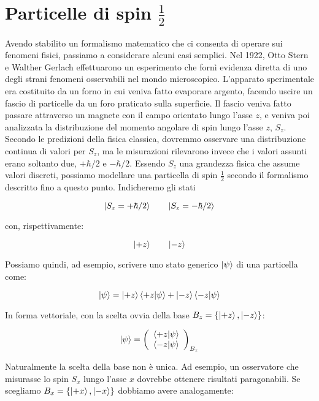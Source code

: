 \section{Particelle di spin $\frac{1}{2}$}

Avendo stabilito un formalismo matematico che ci consenta di operare sui fenomeni fisici, passiamo a considerare alcuni casi semplici.
Nel 1922, Otto Stern e Walther Gerlach effettuarono un esperimento che fornì evidenza diretta di uno degli strani fenomeni osservabili nel mondo microscopico.
L'apparato sperimentale era costituito da un forno in cui veniva fatto evaporare argento, facendo uscire un fascio di particelle da un foro praticato sulla superficie.
Il fascio veniva fatto passare attraverso un magnete con il campo orientato lungo l'asse $z$, e veniva poi analizzata la distribuzione del momento angolare di spin lungo l'asse $z$, $S_z$.
Secondo le predizioni della fisica classica, dovremmo osservare una distribuzione continua di valori per $S_z$, ma le misurazioni
rilevarono invece che i valori assunti erano soltanto due, $+ \hbar / 2$ e $- \hbar / 2$.
Essendo $S_z$ una grandezza fisica che assume valori discreti, possiamo modellare una particella di spin $\frac{1}{2}$ secondo il formalismo descritto fino a questo punto. Indicheremo gli stati

	\[
		\ket{S_z = + \hbar / 2} \quad \quad \ket{S_z = - \hbar / 2}
	\]

con, rispettivamente:

	\[
		\ket{+z} \quad \quad \ket{-z}
	\]

Possiamo quindi, ad esempio, scrivere uno stato generico $\ket{\psi}$ di una particella come:

	\begin{equation}
		\ket{\psi} =  \ket{+z} \braket{+z}{\psi} + \ket{-z} \braket{-z}{\psi}
	\end{equation}

In forma vettoriale, con la scelta ovvia della base $B_z = \{ \ket{+z}, \ket{-z} \}$:

	\begin{equation}
		\ket{\psi} =
			\left ( \begin{array}{c}
				\braket{+z}{\psi} \\
				\braket{-z}{\psi}
			\end{array} \right )_{B_z}
	\end{equation}

Naturalmente la scelta della base non \`e unica. Ad esempio, un osservatore che misurasse lo spin $S_x$ lungo l'asse $x$ dovrebbe ottenere risultati paragonabili. Se scegliamo $B_x = \{ \ket{+x}, \ket{-x} \}$ dobbiamo avere analogamente:

